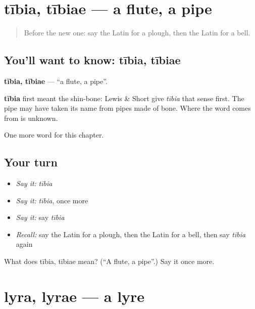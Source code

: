 \section[tībia, tībiae]{tībia, tībiae — a flute, a pipe}

\label{lesson:LA-C142-tibia}



\begin{quote}
Before the new one: say the Latin for a plough, then the Latin for a bell.
\end{quote}

\subsection*{You'll want to know: tībia, tībiae}
\textbf{tībia, tībiae} — \textquotedblleft{}a flute, a pipe\textquotedblright{}.

\begin{cousinweb}
\textbf{tībia} first meant the shin-bone: Lewis \& Short give \emph{tībia} that sense first. The pipe may have taken its name from pipes made of bone. Where the word comes from is unknown.
\end{cousinweb}

\begin{grammarlens}[title={What you've built}]
One more word for this chapter.
\end{grammarlens}

\subsection*{Your turn}
\begin{itemize}
\raggedright
  \item \emph{Say it:} \emph{tībia}
  \item \emph{Say it:} \emph{tībia}, once more
  \item \emph{Say it:} say \emph{tībia}
  \item \emph{Recall:} say the Latin for a plough, then the Latin for a bell, then say \emph{tībia} again
\end{itemize}

\begin{tcolorbox}[breakable,colback=teal!4,colframe=teal!35!black,title={Before you move on}]
What does tībia, tībiae mean? (\textquotedblleft{}A flute, a pipe\textquotedblright{}.) Say it once more.
\end{tcolorbox}
\section[lyra, lyrae]{lyra, lyrae — a lyre}


